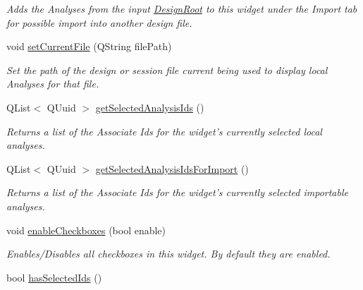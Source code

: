 \begin{DoxyCompactItemize}
\begin{DoxyCompactList}\small\item\em Adds the Analyses from the input \hyperlink{class_picto_1_1_design_root}{Design\-Root} to this widget under the Import tab for possible import into another design file. \end{DoxyCompactList}\item 
void \hyperlink{class_picto_1_1_analysis_selector_widget_aa910d097fe96b75120114e8e1b29df19}{set\-Current\-File} (Q\-String file\-Path)
\begin{DoxyCompactList}\small\item\em Set the path of the design or session file current being used to display local Analyses for that file. \end{DoxyCompactList}\item 
\hypertarget{class_picto_1_1_analysis_selector_widget_a71edbc9ac65774112cfab6593b9a51cc}{Q\-List$<$ Q\-Uuid $>$ \hyperlink{class_picto_1_1_analysis_selector_widget_a71edbc9ac65774112cfab6593b9a51cc}{get\-Selected\-Analysis\-Ids} ()}\label{class_picto_1_1_analysis_selector_widget_a71edbc9ac65774112cfab6593b9a51cc}

\begin{DoxyCompactList}\small\item\em Returns a list of the Associate Ids for the widget's currently selected local analyses. \end{DoxyCompactList}\item 
\hypertarget{class_picto_1_1_analysis_selector_widget_a7ee81957d535d561f13916e24b07a116}{Q\-List$<$ Q\-Uuid $>$ \hyperlink{class_picto_1_1_analysis_selector_widget_a7ee81957d535d561f13916e24b07a116}{get\-Selected\-Analysis\-Ids\-For\-Import} ()}\label{class_picto_1_1_analysis_selector_widget_a7ee81957d535d561f13916e24b07a116}

\begin{DoxyCompactList}\small\item\em Returns a list of the Associate Ids for the widget's currently selected importable analyses. \end{DoxyCompactList}\item 
\hypertarget{class_picto_1_1_analysis_selector_widget_ab95a7447d0400309b775b1c21db3baaf}{void \hyperlink{class_picto_1_1_analysis_selector_widget_ab95a7447d0400309b775b1c21db3baaf}{enable\-Checkboxes} (bool enable)}\label{class_picto_1_1_analysis_selector_widget_ab95a7447d0400309b775b1c21db3baaf}

\begin{DoxyCompactList}\small\item\em Enables/\-Disables all checkboxes in this widget. By default they are enabled. \end{DoxyCompactList}\item 
\hypertarget{class_picto_1_1_analysis_selector_widget_a17a534c12c588843e10ef03c8f99f030}{bool \hyperlink{class_picto_1_1_analysis_selector_widget_a17a534c12c588843e10ef03c8f99f030}{has\-Selected\-Ids} ()}\label{class_picto_1_1_analysis_selector_widget_a17a534c12c588843e10ef03c8f99f030}


\end{DoxyCompactItemize}
